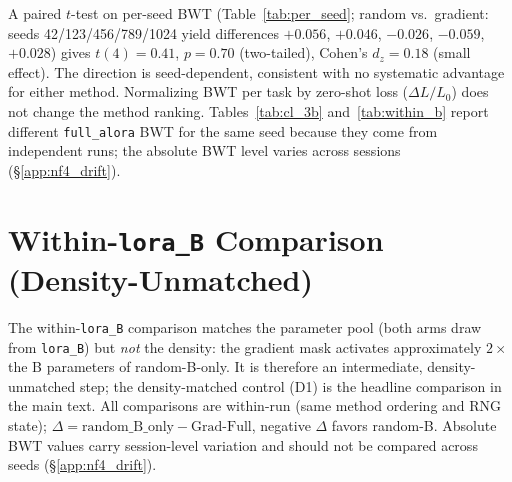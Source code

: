 A paired $t$-test on per-seed BWT (Table~\ref{tab:per_seed}; random vs.\ gradient: seeds 42/123/456/789/1024 yield differences $+0.056$, $+0.046$, $-0.026$, $-0.059$, $+0.028$) gives $t(4) = 0.41$, $p = 0.70$ (two-tailed), Cohen's $d_z = 0.18$ (small effect). 
The direction is seed-dependent, consistent with no systematic advantage for either method. Normalizing BWT per task by zero-shot loss ($\Delta L / L_0$) does not change the method ranking. Tables~\ref{tab:cl_3b} and~\ref{tab:within_b} report different \texttt{full\_alora} BWT for the same seed because they come from independent runs; the absolute BWT level varies across sessions (\S\ref{app:nf4_drift}).




\section{Within-\texttt{lora\_B} Comparison (Density-Unmatched)}
\label{app:within_b}

The within-\texttt{lora\_B} comparison matches the parameter pool (both arms draw from \texttt{lora\_B}) but \emph{not} the density: the gradient mask activates approximately $2\times$ the B parameters of random-B-only. It is therefore an intermediate, density-unmatched step; the density-matched control (D1) is the headline comparison in the main text. All comparisons are within-run (same method ordering and RNG state); $\Delta = \text{random\_B\_only} - \text{Grad-Full}$, negative $\Delta$ favors random-B. Absolute BWT values carry session-level variation and should not be compared across seeds (\S\ref{app:nf4_drift}).

